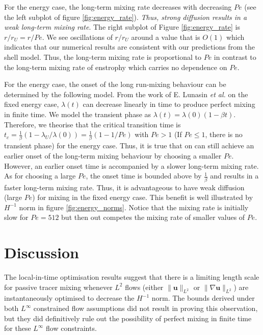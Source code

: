 \documentclass[12pt]{iopart}
\newcommand{\ltwo}[1]{\|#1\|_{L^{2}}}
\begin{document}
For the energy case, the long-term mixing rate decreases with decreasing $Pe$ (see the left subplot of figure \ref{fig:energy_rate}).  {\it Thus, strong diffusion results in a weak long-term mixing rate}. The right subplot of Figure \ref{fig:energy_rate} is $r/r_{U} =  r/Pe$. We see oscillations of $r/r_{U}$ around a value that is $O(1)$ which indicates that our numerical results are consistent with our predictions from the shell model. Thus, the long-term mixing rate is proportional to $Pe$ in contrast to the long-term mixing rate of enstrophy which carries no dependence on $Pe$.

For the energy case, the onset of the long run-mixing behaviour can be determined by the following model. From the work of E. Lunasin {\it et al.} \cite{JMP2012} on the fixed energy case, $\lambda(t)$ can decrease linearly in time to produce perfect mixing in finite time. We model the transient phase as $\lambda(t)=\lambda(0)(1-\beta t)$. Therefore, we theorise that the critical transition time is $t_{c}=\frac{1}{\beta}(1 -\lambda_{U}/\lambda(0)) = \frac{1}{\beta}(1 - 1/Pe)$ with $Pe> 1$ (If $Pe \leq 1$, there is no transient phase) for the energy case. Thus, it is true that on can still achieve an earlier onset of the long-term mixing behaviour by choosing a smaller $Pe$. However, an earlier onset time is accompanied by a slower long-term mixing rate. As for choosing a large $Pe$, the onset time is bounded above by $\frac{1}{\beta}$ and results in a faster long-term mixing rate. Thus, it is advantageous to have weak diffusion (large $Pe$) for mixing in the fixed energy case. This benefit is well illustrated by $H^{-1}$ norm in figure \ref{fig:energy_norms}. Notice that the mixing rate is initially slow for $Pe = 512$ but then out competes the mixing rate of smaller values of $Pe$.    


\section{Discussion}
\label{sec:discussion}
%
The local-in-time optimisation results suggest that there is a limiting length scale for passive tracer mixing whenever $L^{2}$ flows (either $\ltwo{\mathbf{u}}$ or $\ltwo{\nabla\mathbf{u}}$) are instantaneously optimised to decrease the $H^{-1}$ norm. The bounds derived under both $L^{\infty}$ constrained flow assumptions did not result in proving this observation, but they did definitively rule out the possibility of perfect mixing in finite time for these $L^{\infty}$ flow constraints. 
\end{document}
